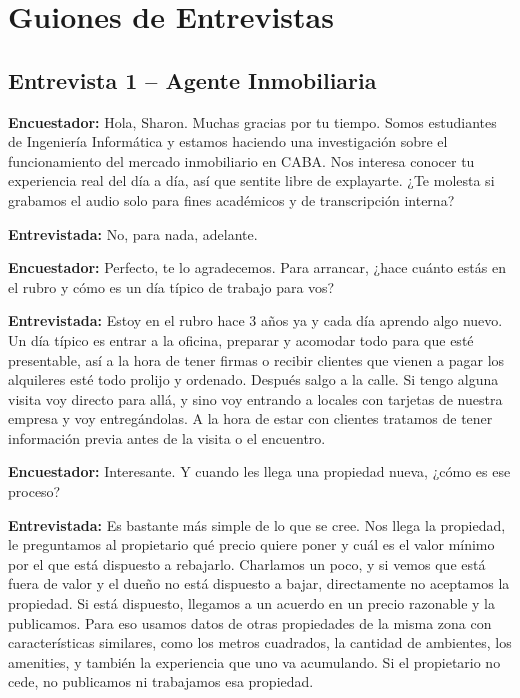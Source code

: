 
\section{Guiones de Entrevistas}

\subsection{Entrevista 1 -- Agente Inmobiliaria}

\textbf{Encuestador:} Hola, Sharon. Muchas gracias por tu tiempo. Somos estudiantes de Ingeniería Informática y estamos haciendo una investigación sobre el funcionamiento del mercado inmobiliario en CABA. Nos interesa conocer tu experiencia real del día a día, así que sentite libre de explayarte. ¿Te molesta si grabamos el audio solo para fines académicos y de transcripción interna?

\textbf{Entrevistada:} No, para nada, adelante.

\textbf{Encuestador:} Perfecto, te lo agradecemos. Para arrancar, ¿hace cuánto estás en el rubro y cómo es un día típico de trabajo para vos?

\textbf{Entrevistada:} Estoy en el rubro hace 3 años ya y cada día aprendo algo nuevo. Un día típico es entrar a la oficina, preparar y acomodar todo para que esté presentable, así a la hora de tener firmas o recibir clientes que vienen a pagar los alquileres esté todo prolijo y ordenado. Después salgo a la calle. Si tengo alguna visita voy directo para allá, y sino voy entrando a locales con tarjetas de nuestra empresa y voy entregándolas. A la hora de estar con clientes tratamos de tener información previa antes de la visita o el encuentro.

\textbf{Encuestador:} Interesante. Y cuando les llega una propiedad nueva, ¿cómo es ese proceso?

\textbf{Entrevistada:} Es bastante más simple de lo que se cree. Nos llega la propiedad, le preguntamos al propietario qué precio quiere poner y cuál es el valor mínimo por el que está dispuesto a rebajarlo. Charlamos un poco, y si vemos que está fuera de valor y el dueño no está dispuesto a bajar, directamente no aceptamos la propiedad. Si está dispuesto, llegamos a un acuerdo en un precio razonable y la publicamos. Para eso usamos datos de otras propiedades de la misma zona con características similares, como los metros cuadrados, la cantidad de ambientes, los amenities, y también la experiencia que uno va acumulando. Si el propietario no cede, no publicamos ni trabajamos esa propiedad.

